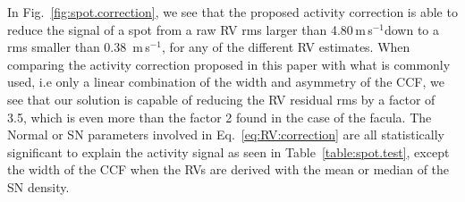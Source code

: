 \documentclass{aa}
\def\ms{\hbox{\,m\,s$^{-1}$}}         %
\begin{document}
In Fig.~\ref{fig:spot.correction}, we see that the proposed activity correction is able to reduce the signal of a spot from a raw RV rms larger than 4.80\ms down to a rms smaller than 0.38 \ms, for any of the different RV estimates.
When comparing the activity correction proposed in this paper with what is commonly used, i.e only a linear combination of the width and asymmetry of the CCF, we see that our solution is capable of reducing the RV residual rms by a factor of 3.5, which is even more than the factor 2 found in the case of the facula.
The Normal or SN parameters involved in Eq.~\eqref{eq:RV:correction} are all statistically significant to explain the activity signal as seen in Table~\ref{table:spot.test}, except the width of the CCF when the RVs are derived with the mean or median of the SN density.
\end{document}
